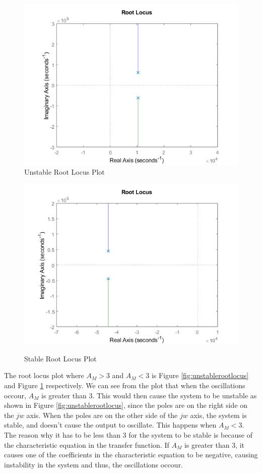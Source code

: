 \documentclass[12pt]{article}
\begin{document}
\begin{figure}
\centering
\begin{minipage}{.5\textwidth}
    \centering
    \includegraphics[height=0.7\textwidth]{Images/unstablerootlocus.png}\\
    \caption{Unstable Root Locus Plot}
    \label{fig:unstablerootlocus}
\end{minipage}%
\begin{minipage}{.5\textwidth}
    \centering
    \includegraphics[height=0.7\textwidth]{Images/stablerootlocus.png}\\
    \caption{Stable Root Locus Plot}
    \label{fig:rootlocus}
\end{minipage}
\end{figure}
\FloatBarrier
The root locus plot where $A_M>3$ and $A_M<3$ is Figure \ref{fig:unstablerootlocus} and Figure \ref{fig:rootlocus} respectively. 
We can see from the plot that when the oscillations occour, $A_M$ is greater than 3. This would then cause the system to be 
unstable as shown in Figure \ref{fig:unstablerootlocus}, since the poles are on the right side on the $jw$ axis. When the
poles are on the other side of the $jw$ axis, the system is stable, and doesn't cause the output to oscillate. This happens
when $A_M<3$. The reason why it has to be less than 3 for the system to be stable is because of the characteristic equation in the transfer function. 
If $A_M$ is greater than 3, it causes one of the coefficients in the characteristic equation to be negative, causing instability
in the system and thus, the oscillations occour.
\end{document}
